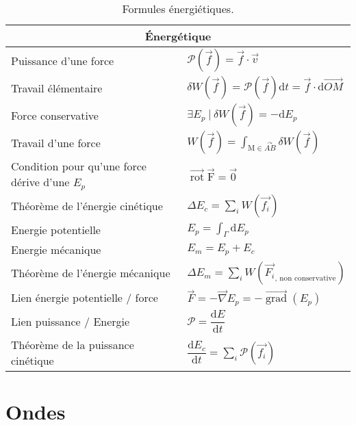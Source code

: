 \documentclass[10pt,a4paper,titlepage,landscape]{article}
\renewcommand{\d}
{
    \mathrm{d}
}
\newcommand*{\dv}[2]
{
    \dfrac{\d#1}{\d#2}
}
\newcommand{\rot}
{
    \vec{\operatorname{rot}}
}
\newcommand{\grad}
{
    \vec{\operatorname{grad}}
}
\renewcommand{\arraystretch}{2}
\begin{document}
\begin{table}[H]
    \centering
    \renewcommand{\arraystretch}{1.5} %
    \setlength{\tabcolsep}{8pt} %
    \begin{tabular}{@{}|p{9cm}|p{10cm}@{}|}

        \multicolumn{2}{c}{\textbf{Énergétique}} \\ \hline

    Puissance d'une force & $\mathcal{P}(\vec{f}) = \vec{f} \cdot \vec{v}$ \\ \hline 
    Travail élémentaire & $\delta W(\vec{f}) = \mathcal{P}(\vec{f})\text{d}t=\vec{f}\cdot \text{d}\vec{OM}$ \\ \hline 
    Force conservative & $\exists E_{p} \ | \ \delta W(\vec{f}) = -\text{d}E_{p}$ \\ \hline 
    Travail d'une force & $\displaystyle W(\vec{f}) = \int_{\text{M}\in\overset{\curvearrowright}{AB}}\delta W(\vec{f})$ \\ \hline 
    Condition pour qu'une force dérive d'une $E_p$ & $\rot{\vec{\text{F}}} = \vec{0}$ \\ \hline 
    Théorème de l'énergie cinétique & $\displaystyle \Delta E_c = \sum\limits_{i}W(\vec{f_i})$ \\ \hline 
    Energie potentielle & $\displaystyle E_p = \int_{\Gamma}\text{d}E_p$ \\ \hline 
    Energie mécanique & $E_m = E_p + E_c$ \\ \hline 
    Théorème de l'énergie mécanique & $\displaystyle \Delta E_m = \sum_{i}W(\vec{F_i}_{\text{, non conservative}})$ \\ \hline 
    Lien énergie potentielle / force & $\vec{F} = -\vec{\nabla} E_p = -\grad(E_p)$ \\ \hline 
    Lien puissance / Energie & $\mathcal{P} = \dv{E}{t}$ \\ \hline 
    Théorème de la puissance cinétique & $\displaystyle \dv{E_c}{t} = \sum_{i}\mathcal{P}(\vec{f_i})$ \\ \hline 
    \end{tabular}
\caption{Formules énergiétiques.}
\label{tab:energetique}
\end{table}


\section{Ondes}
\end{document}
